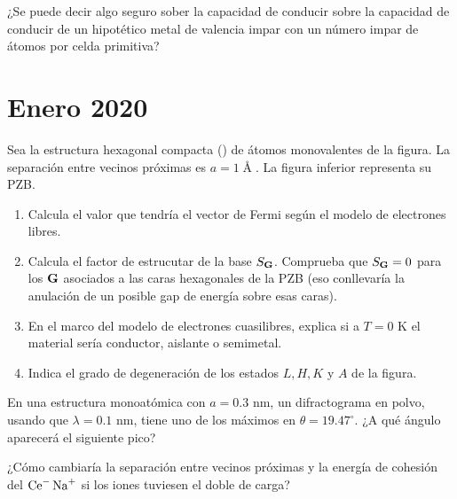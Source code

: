 \begin{ejercicio}
	¿Se puede decir algo seguro sober la capacidad de conducir sobre la capacidad de conducir de un hipotético metal de valencia impar con un número impar de átomos por celda primitiva?
\end{ejercicio}

\newpage


\section*{Enero 2020}
\setcounter{section}{3} %

\begin{ejercicio}
	Sea la estructura hexagonal compacta (\hcp) de átomos monovalentes de la figura. La separación entre vecinos próximas es $a=1\unit{\Angstrom}$. La figura inferior representa su PZB.
	\begin{enumerate}[label=\alph*)]
		\item Calcula el valor que tendría el vector de Fermi según el modelo de electrones libres.
		\item Calcula el factor de estrucutar de la base $S_{\mathbf{G}}$. Comprueba que $S_{\mathbf{G}}=0$ para los $\mathbf{G}$ asociados a las caras hexagonales de la PZB (eso conllevaría la anulación de un posible gap de energía sobre esas caras).
		\item En el marco del modelo de electrones cuasilibres, explica si a $T=0$ K el material sería conductor, aislante o semimetal.
		\item Indica el grado de degeneración de los estados $L,H,K$ y $A$ de la figura.
	\end{enumerate}
\end{ejercicio}

\begin{ejercicio}
	En una estructura \fcc monoatómica con $a=0.3$ nm, un difractograma en polvo, usando que $\lambda=0.1$ nm, tiene uno de los máximos en $\theta=19.47^\circ$. ¿A qué ángulo aparecerá el siguiente pico?
\end{ejercicio}

\begin{ejercicio}
	¿Cómo cambiaría la separación entre vecinos próximas y la energía de cohesión del $\ce{Ce^- Na^+}$ si los iones tuviesen el doble de carga?
\end{ejercicio}

